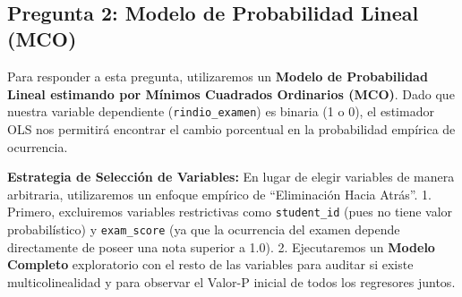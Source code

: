 \documentclass[11pt]{article}
\begin{document}
    \begin{center}
    \end{center}
    { \hspace*{\fill} \\}
    
    \subsection{Pregunta 2: Modelo de Probabilidad Lineal
(MCO)}\label{pregunta-2-modelo-de-probabilidad-lineal-mco}

Para responder a esta pregunta, utilizaremos un \textbf{Modelo de
Probabilidad Lineal estimando por Mínimos Cuadrados Ordinarios (MCO)}.
Dado que nuestra variable dependiente (\texttt{rindio\_examen}) es
binaria (1 o 0), el estimador OLS nos permitirá encontrar el cambio
porcentual en la probabilidad empírica de ocurrencia.

\textbf{Estrategia de Selección de Variables:} En lugar de elegir
variables de manera arbitraria, utilizaremos un enfoque empírico de
``Eliminación Hacia Atrás''. 1. Primero, excluiremos variables
restrictivas como \texttt{student\_id} (pues no tiene valor
probabilístico) y \texttt{exam\_score} (ya que la ocurrencia del examen
depende directamente de poseer una nota superior a 1.0). 2. Ejecutaremos
un \textbf{Modelo Completo} exploratorio con el resto de las variables
para auditar si existe multicolinealidad y para observar el Valor-P
inicial de todos los regresores juntos.
\end{document}

